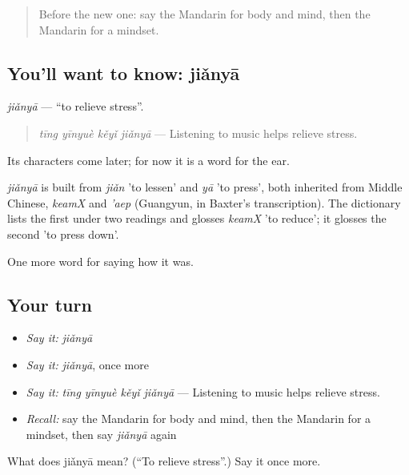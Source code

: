 \label{lesson:ZH-C485-jianya}



\begin{quote}
Before the new one: say the Mandarin for body and mind, then the Mandarin for a mindset.
\end{quote}

\subsection*{You'll want to know: jiǎnyā}
\emph{jiǎnyā} — \textquotedblleft{}to relieve stress\textquotedblright{}.

\begin{quote}
\emph{tīng yīnyuè kěyǐ jiǎnyā} — Listening to music helps relieve stress.
\end{quote}

Its characters come later; for now it is a word for the ear.

\begin{cousinweb}
\emph{jiǎnyā} is built from \emph{jiǎn} 'to lessen' and \emph{yā} 'to press', both inherited from Middle Chinese, \emph{keamX} and \emph{'aep} (Guangyun, in Baxter's transcription). The dictionary lists the first under two readings and glosses \emph{keamX} 'to reduce'; it glosses the second 'to press down'.
\end{cousinweb}

\begin{grammarlens}[title={What you've built}]
One more word for saying how it was.
\end{grammarlens}

\subsection*{Your turn}
\begin{itemize}
\raggedright
  \item \emph{Say it:} \emph{jiǎnyā}
  \item \emph{Say it:} \emph{jiǎnyā}, once more
  \item \emph{Say it:} \emph{tīng yīnyuè kěyǐ jiǎnyā} — Listening to music helps relieve stress.
  \item \emph{Recall:} say the Mandarin for body and mind, then the Mandarin for a mindset, then say \emph{jiǎnyā} again
\end{itemize}

\begin{tcolorbox}[breakable,colback=teal!4,colframe=teal!35!black,title={Before you move on}]
What does jiǎnyā mean? (\textquotedblleft{}To relieve stress\textquotedblright{}.) Say it once more.
\end{tcolorbox}
